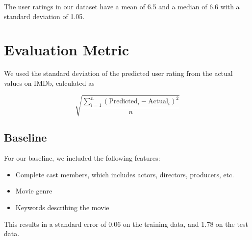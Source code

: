 \documentclass[journal]{IEEEtran}
\begin{document}

The user ratings in our dataset have a mean of 6.5 and a median of 6.6 with a standard deviation of 1.05.

\section{Evaluation Metric}
We used the standard deviation of the predicted user rating from the actual values on IMDb, calculated as

$$ \sqrt{\frac{\sum_{i=1}^n(\text{Predicted}_i-\text{Actual}_i)^2}{n}} $$

\subsection{Baseline}
For our baseline, we included the following features:
\\
\begin{itemize}
	\item Complete cast members, which includes actors, directors, producers, etc.
	\item Movie genre
	\item Keywords describing the movie
\end{itemize}
\bigskip

\par This results in a standard error of 0.06 on the training data, and
1.78 on the test data.
\end{document}

